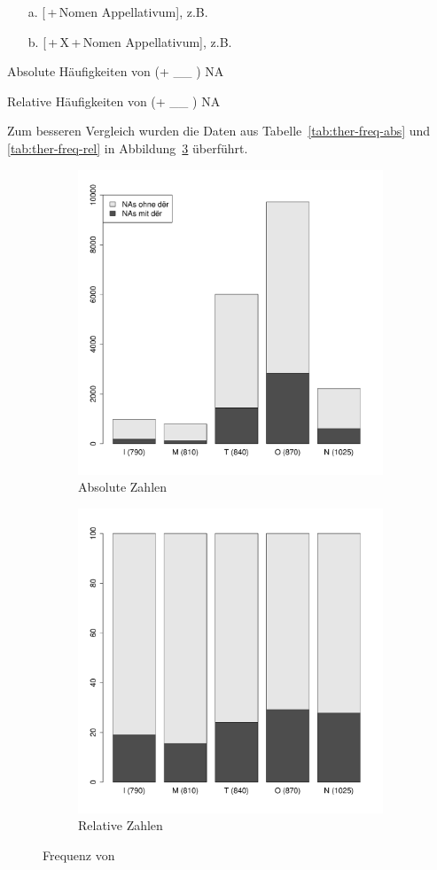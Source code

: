 \begin{itemize}
\item[a.] [\object{dër}\,+\,Nomen Appellativum], z.B. 
\item[b.] [\object{dër}\,+\,X\,+\,Nomen Appellativum],
z.B.  %
\end{itemize}

\begin{table}
\centering

\caption{Absolute Häufigkeiten von  (+ \_\_ ) NA}
\label{tab:ther-freq-abs}
\end{table}

\begin{table}
\centering

\caption{Relative Häufigkeiten von  (+ \_\_ ) NA}
\label{tab:ther-freq-rel}
\end{table}

Zum besseren Vergleich wurden die Daten aus Tabelle~\ref{tab:ther-freq-abs} und \ref{tab:ther-freq-rel} in Abbildung~\ref{abb:art-freq} überführt.  

\begin{figure}
\begin{subfigure}[b]{.5\linewidth}
  \includegraphics[width=7 cm]{generated/images/artikel-anzahl-abs}
\caption {Absolute Zahlen}
\label{fig:art-abs}
\end{subfigure}%
\begin{subfigure}[b]{.5\linewidth}
  \includegraphics[width=7 cm]{generated/images/artikel-anzahl-rel}
\caption {Relative Zahlen}
\label{fig:art-rel}
\end{subfigure}
\caption{Frequenz von }
\label{abb:art-freq}
\end{figure}


